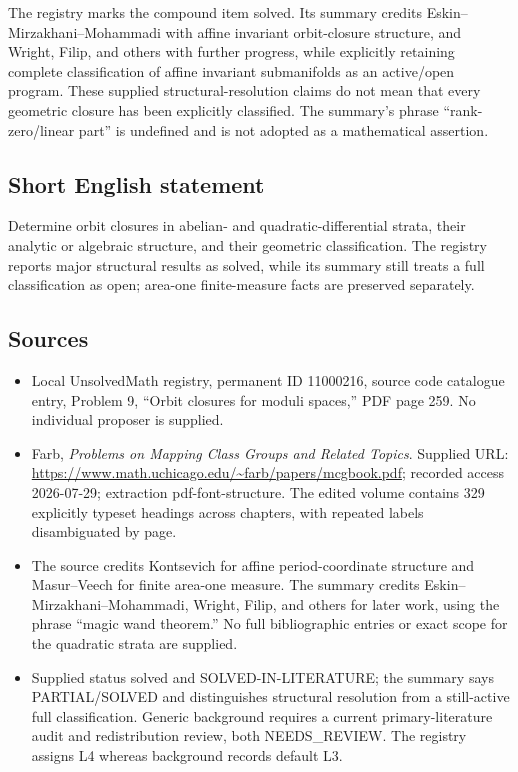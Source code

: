 \documentclass[11pt]{article}
\begin{document}
The registry marks the compound item solved. Its summary credits Eskin--Mirzakhani--Mohammadi with affine invariant orbit-closure structure, and Wright, Filip, and others with further progress, while explicitly retaining complete classification of affine invariant submanifolds as an active/open program. These supplied structural-resolution claims do not mean that every geometric closure has been explicitly classified. The summary's phrase ``rank-zero/linear part'' is undefined and is not adopted as a mathematical assertion.
\subsection{Short English statement}
Determine orbit closures in abelian- and quadratic-differential strata, their analytic or algebraic structure, and their geometric classification. The registry reports major structural results as solved, while its summary still treats a full classification as open; area-one finite-measure facts are preserved separately.
\subsection{Sources}
\begin{itemize}
\item Local UnsolvedMath registry, permanent ID 11000216, source code catalogue entry, Problem 9, ``Orbit closures for moduli spaces,'' PDF page 259. No individual proposer is supplied.
\item Farb, \emph{Problems on Mapping Class Groups and Related Topics}. Supplied URL: \url{https://www.math.uchicago.edu/~farb/papers/mcgbook.pdf}; recorded access 2026-07-29; extraction pdf-font-structure. The edited volume contains 329 explicitly typeset headings across chapters, with repeated labels disambiguated by page.
\item The source credits Kontsevich for affine period-coordinate structure and Masur--Veech for finite area-one measure. The summary credits Eskin--Mirzakhani--Mohammadi, Wright, Filip, and others for later work, using the phrase ``magic wand theorem.'' No full bibliographic entries or exact scope for the quadratic strata are supplied.
\item Supplied status solved and SOLVED-IN-LITERATURE; the summary says PARTIAL/SOLVED and distinguishes structural resolution from a still-active full classification. Generic background requires a current primary-literature audit and redistribution review, both NEEDS\_REVIEW. The registry assigns L4 whereas background records default L3.
\end{itemize}
\end{document}
